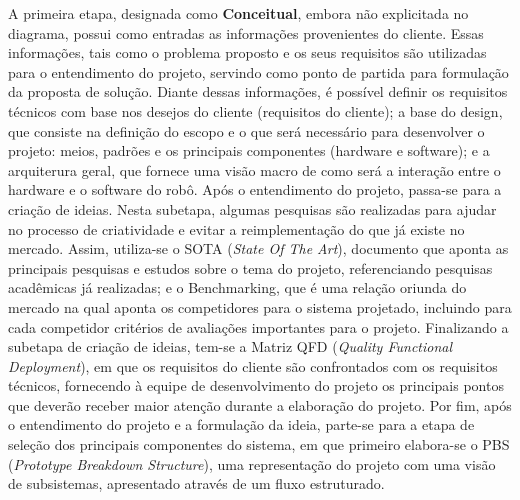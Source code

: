A primeira etapa, designada como \textbf{Conceitual}, embora não explicitada no diagrama, possui como entradas as informações provenientes do cliente. Essas informações, tais como o problema proposto e os seus requisitos são utilizadas para o entendimento do projeto, servindo como ponto de partida para formulação da proposta de solução. Diante dessas informações, é possível definir os requisitos técnicos com base nos desejos do cliente (requisitos do cliente); a base do design, que consiste na definição do escopo e o que será necessário para desenvolver o projeto: meios, padrões e os principais componentes (hardware e software); e a arquiterura geral, que fornece uma visão macro de como será a interação entre o hardware e o software do robô. Após o entendimento do projeto, passa-se para a criação de ideias. Nesta subetapa, algumas pesquisas são realizadas para ajudar no processo de criatividade e evitar a reimplementação do que já existe no mercado. Assim, utiliza-se o SOTA (\textit{State Of The Art}), documento que aponta as principais pesquisas  e estudos sobre o tema do projeto, referenciando pesquisas acadêmicas já realizadas; e o Benchmarking, que é uma relação oriunda do mercado na qual aponta os competidores para o sistema projetado, incluindo para cada competidor critérios de avaliações importantes para o projeto. Finalizando a subetapa de criação de ideias, tem-se a Matriz QFD (\textit{Quality Functional Deployment}), em que os requisitos do cliente são confrontados com os requisitos técnicos, fornecendo à equipe de desenvolvimento do projeto os principais pontos que deverão receber maior atenção durante a elaboração do projeto. Por fim, após o entendimento do projeto e a formulação da ideia, parte-se para a etapa de seleção dos principais componentes do  sistema, em que primeiro elabora-se o PBS (\textit{Prototype Breakdown Structure}), uma representação do projeto com uma visão de subsistemas, apresentado através de um fluxo estruturado.

